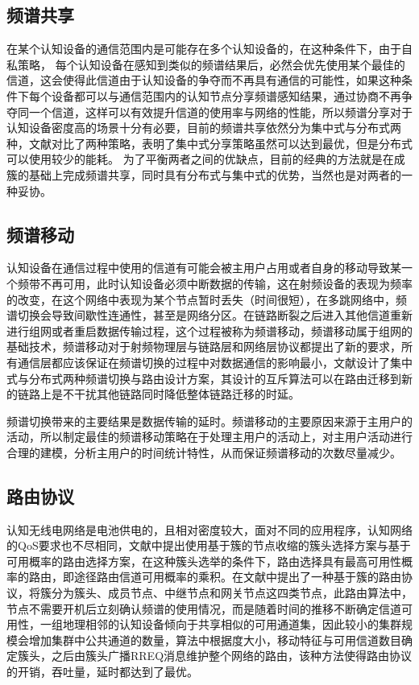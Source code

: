 \documentclass[a4paper,AutoFakeBold,oneside,12pt]{book}
\begin{document}
\subsection{频谱共享}
  在某个认知设备的通信范围内是可能存在多个认知设备的，在这种条件下，由于自私策略， 每个认知设备在感知到类似的频谱结果后，必然会优先使用某个最佳的信道，这会使得此信道由于认知设备的争夺而不再具有通信的可能性，如果这种条件下每个设备都可以与通信范围内的认知节点分享频谱感知结果，通过协商不再争夺同一个信道，这样可以有效提升信道的使用率与网络的性能，所以频谱分享对于认知设备密度高的场景十分有必要，目前的频谱共享依然分为集中式与分布式两种，文献\cite{uafs}对比了两种策略，表明了集中式分享策略虽然可以达到最优，但是分布式可以使用较少的能耗。
  为了平衡两者之间的优缺点，目前的经典的方法就是在成簇的基础上完成频谱共享，同时具有分布式与集中式的优势，当然也是对两者的一种妥协。
\subsection{频谱移动}
  认知设备在通信过程中使用的信道有可能会被主用户占用或者自身的移动导致某一个频带不再可用，此时认知设备必须中断数据的传输，这在射频设备的表现为频率的改变，在这个网络中表现为某个节点暂时丢失（时间很短），在多跳网络中，频谱切换会导致间歇性连通性，甚至是网络分区。在链路断裂之后进入其他信道重新进行组网或者重启数据传输过程，这个过程被称为频谱移动，频谱移动属于组网的基础技术，频谱移动对于射频物理层与链路层和网络层协议都提出了新的要求，所有通信层都应该保证在频谱切换的过程中对数据通信的影响最小，文献\cite{spectrumyidong}设计了集中式与分布式两种频谱切换与路由设计方案，其设计的互斥算法可以在路由迁移到新的链路上是不干扰其他链路同时降低整体链路迁移的时延。
  
  频谱切换带来的主要结果是数据传输的延时。频谱移动的主要原因来源于主用户的活动，所以制定最佳的频谱移动策略在于处理主用户的活动上，对主用户活动进行合理的建模，分析主用户的时间统计特性，从而保证频谱移动的次数尽量减少。
\subsection{路由协议}
  认知无线电网络是电池供电的，且相对密度较大，面对不同的应用程序，认知网络的QoS要求也不尽相同，文献\cite{luyou1}中提出使用基于簇的节点收缩的簇头选择方案与基于可用概率的路由选择方案，在这种簇头选举的条件下，路由选择具有最高可用性概率的路由，即途径路由信道可用概率的乘积。在文献\cite{luyou2}中提出了一种基于簇的路由协议，将簇分为簇头、成员节点、中继节点和网关节点这四类节点，此路由算法中，节点不需要开机后立刻确认频谱的使用情况，而是随着时间的推移不断确定信道可用性，一组地理相邻的认知设备倾向于共享相似的可用通道集，因此较小的集群规模会增加集群中公共通道的数量，算法中根据度大小，移动特征与可用信道数目确定簇头，之后由簇头广播RREQ消息维护整个网络的路由，该种方法使得路由协议的开销，吞吐量，延时都达到了最优。
\end{document}
